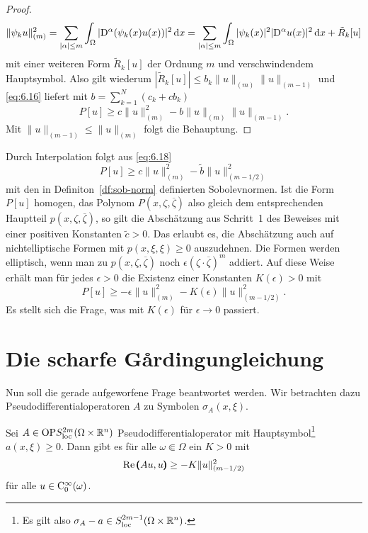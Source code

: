 \begin{proof}
\begin{equation}
   \|\psi_k u\|_{(m)}^2 =  \sum_{|\alpha|\le m} \int_\Omega |\mathrm D^\alpha (\psi_k(x) u(x)) |^2 \,\mathrm d x
   =   \sum_{|\alpha|\le m} \int_\Omega  |\psi_k(x)|^2  |\mathrm D^\alpha u(x) |^2 \,\mathrm d x + \tilde R_k[u]
\end{equation}
mit einer weiteren Form $\tilde R_k[u]$  der Ordnung $m$ und verschwindendem Hauptsymbol. Also gilt wiederum $|\tilde R_k[u]|\le b_k \|u\|_{(m)}\|u\|_{(m-1)}$ und  \eqref{eq:6.16} liefert mit $b= \sum_{k=1}^N (c_k + c b_k  )$
\begin{equation}\label{eq:6.18}
P[u] \ge c \|u\|_{(m)}^2 - b \|u\|_{(m)}\|u\|_{(m-1)} .
\end{equation}
Mit $\|u\|_{(m-1)}\le \|u\|_{(m)}$ folgt die Behauptung.
\end{proof}

\begin{rem} 
Durch Interpolation folgt aus \eqref{eq:6.18}
\begin{equation}
P[u] \ge c \|u\|_{(m)}^2 - \tilde b \|u\|_{(m-1/2)}^2
\end{equation}
mit den in Definiton~\ref{df:sob-norm} definierten Sobolevnormen. Ist die Form $P[u]$ homogen, das Polynom $P(x,\zeta,\overline \zeta)$ also gleich dem entsprechenden Hauptteil $p(x,\zeta,\overline\zeta)$, so gilt die Abschätzung aus Schritt~1 des Beweises mit einer positiven Konstanten $\tilde c>0$. Das erlaubt es, die Abschätzung auch auf nichtelliptische Formen mit $p(x,\xi,\xi)\ge0$ auszudehnen. Die Formen werden elliptisch, wenn man zu $p(x,\zeta,\overline\zeta)$
noch $\epsilon ( \zeta\cdot\overline\zeta )^{m}$ addiert. Auf diese Weise erhält man für jedes $\epsilon>0$ 
die Existenz einer Konstanten $K(\epsilon)>0$ mit
\begin{equation}
P[u] \ge -\epsilon \|u\|_{(m)}^2 - K(\epsilon) \|u\|_{(m-1/2)}^2.
\end{equation}
Es stellt sich die Frage, was mit $K(\epsilon)$ für $\epsilon\to0$ passiert. 
\end{rem}

\section{Die scharfe G\r{a}rdingungleichung}

Nun soll die gerade aufgeworfene Frage beantwortet werden. Wir betrachten dazu Pseudodifferentialoperatoren $A$ zu Symbolen $\sigma_A(x,\xi)$.

\begin{thm}
Sei $A\in {\rm OP}S^{2m}_{\rm loc}(\Omega\times\mathbb R^n)$ Pseudodifferentialoperator mit Hauptsymbol\footnote{Es gilt also $\sigma_A-a\in S^{2m-1}_{\rm loc}(\Omega\times\mathbb R^n)$.} $a(x,\xi)\ge0$. Dann gibt es  für alle $\omega\Subset \Omega$ ein $K>0$ mit
 \begin{equation}
    \operatorname{Re} \pmb(Au,u\pmb) \ge - K \|u\|_{(m-1/2)}^2 
 \end{equation}
 für alle $u\in\mathrm C_0^\infty(\omega)$.
\end{thm}


